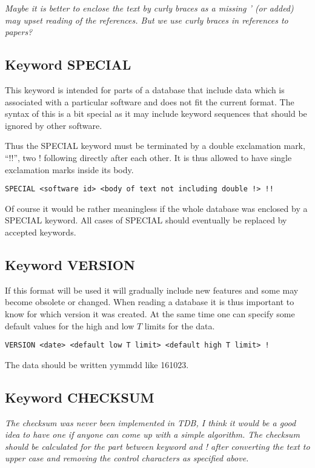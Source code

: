 \documentclass[12pt]{article}
\begin{document}
{\em Maybe it is better to enclose the text by curly braces {} as
  a missing ' (or added) may upset reading of the references.  But we
  use curly braces in references to papers?}

\subsection{Keyword SPECIAL}

This keyword is intended for parts of a database that include data
which is associated with a particular software and does not fit the
current format.  The syntax of this is a bit special as it may include
keyword sequences that should be ignored by other software.

Thus the SPECIAL keyword must be terminated by a double exclamation
mark, ``!!'', two ! following directly after each other.  It is thus
allowed to have single exclamation marks inside its body.

\begin{verbatim} 
SPECIAL <software id> <body of text not including double !> !!
\end{verbatim} 

Of course it would be rather meaningless if the whole database was
enclosed by a SPECIAL keyword.  All cases of SPECIAL should eventually
be replaced by accepted keywords.

\subsection{Keyword VERSION}

If this format will be used it will gradually include new features and
some may become obsolete or changed.  When reading a database it is
thus important to know for which version it was created.  At the same
time one can specify some default values for the high and low $T$
limits for the data.

\begin{verbatim}
VERSION <date> <default low T limit> <default high T limit> !
\end{verbatim}

The data should be written yymmdd like 161023.

\subsection{Keyword CHECKSUM}

{\em The checksum was never been implemented in TDB, I think it would
  be a good idea to have one if anyone can come up with a simple
  algorithm.  The checksum should be calculated for the part between
  keyword and ! after converting the text to upper case and removing
  the control characters as specified above.}
\end{document}
